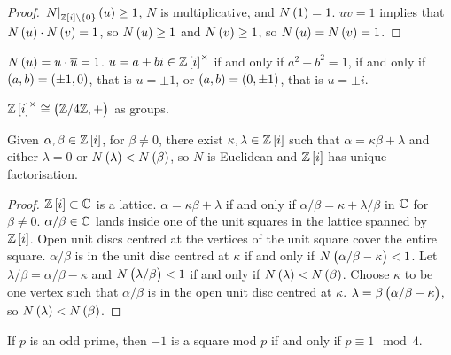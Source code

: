 \begin{proof}
$ \eval{N}_{\Z\sbr{i} \setminus \cbr{0}}\br{u} \ge 1 $, $ N $ is multiplicative, and $ N\br{1} = 1 $. $ uv = 1 $ implies that $ N\br{u} \cdot N\br{v} = 1 $, so $ N\br{u} \ge 1 $ and $ N\br{v} \ge 1 $, so $ N\br{u} = N\br{v} = 1 $.
\end{proof}

$ N\br{u} = u \cdot \overline{u} = 1 $. $ u = a + bi \in \Z\sbr{i}^\times $ if and only if $ a^2 + b^2 = 1 $, if and only if $ \br{a, b} = \br{\pm 1, 0} $, that is $ u = \pm 1 $, or $ \br{a, b} = \br{0, \pm 1} $, that is $ u = \pm i $.

\begin{remark*}
$ \Z\sbr{i}^\times \cong \br{\Z / 4\Z, +} $ as groups.
\end{remark*}

\begin{proposition}
Given $ \alpha, \beta \in \Z\sbr{i} $, for $ \beta \ne 0 $, there exist $ \kappa, \lambda \in \Z\sbr{i} $ such that $ \alpha = \kappa\beta + \lambda $ and either $ \lambda = 0 $ or $ N\br{\lambda} < N\br{\beta} $, so $ N $ is Euclidean and $ \Z\sbr{i} $ has unique factorisation.
\end{proposition}

\begin{proof}
$ \Z\sbr{i} \subset \C $ is a lattice. $ \alpha = \kappa\beta + \lambda $ if and only if $ \alpha / \beta = \kappa + \lambda / \beta $ in $ \mathbb{C} $ for $ \beta \ne 0 $. $ \alpha / \beta \in \mathbb{C} $ lands inside one of the unit squares in the lattice spanned by $ \Z\sbr{i} $. Open unit discs centred at the vertices of the unit square cover the entire square. $ \alpha / \beta $ is in the unit disc centred at $ \kappa $ if and only if $ N\br{\alpha / \beta - \kappa} < 1 $. Let $ \lambda / \beta = \alpha / \beta - \kappa $ and $ N\br{\lambda / \beta} < 1 $ if and only if $ N\br{\lambda} < N\br{\beta} $. Choose $ \kappa $ to be one vertex such that $ \alpha / \beta $ is in the open unit disc centred at $ \kappa $. $ \lambda = \beta\br{\alpha / \beta - \kappa} $, so $ N\br{\lambda} < N\br{\beta} $.
\end{proof}

\begin{lemma}
If $ p $ is an odd prime, then $ -1 $ is a square mod $ p $ if and only if $ p \equiv 1 \mod 4 $.
\end{lemma}

